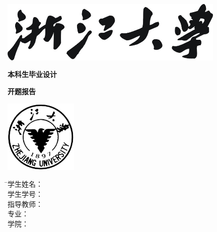 
\thispagestyle{empty}

\vspace{5mm}

\begin{center}
   \includegraphics[width=108mm]{images/zjdx}
\end{center}

\centerline{\songti\erhao\textbf{本科生毕业设计}}
\centerline{\songti\erhao\textbf{开题报告}}
\vspace{4mm}

\begin{center}
  \includegraphics[width=35mm]{images/standxb}
\end{center}

\vspace{32mm}

\begin{tabbing}
               \hspace{30mm} \= \songti\sihao 学生姓名： \= \underline{\makebox[6cm]{\sihao\zjuauthornamec\hspace{3mm}\zjuauthorid}} \\[2mm]
              \> \songti\sihao 学生学号： \> \underline{\makebox[6cm]{}} \\[2mm]
              \> \songti\sihao 指导教师： \> \underline{\makebox[6cm]{\sihao\zjumentorc}} \\[2mm]
              \> \songti\sihao 专\hspace{10mm}业： \> \underline{\makebox[6cm]{\sihao\zjugrade\hspace{3mm}\zjumajor}} \\[2mm]
              \> \songti\sihao 学\hspace{10mm}院： \> \underline{\makebox[6cm]{}}
\end{tabbing}


